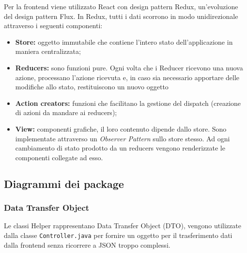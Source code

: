 Per la frontend viene utilizzato React con design pattern Redux, un'evoluzione del design pattern Flux.
In Redux, tutti i dati scorrono in modo unidirezionale attraverso i seguenti componenti:
\begin{itemize}
    \item \textbf{Store: }oggetto immutabile che contiene l'intero stato dell'applicazione in maniera centralizzata;
    \item \textbf{Reducers: }sono funzioni pure. Ogni volta che i Reducer ricevono una nuova azione, 
    processano l'azione ricevuta e, in caso sia necessario apportare delle modifiche allo stato, restituiscono un nuovo oggetto 
    \item \textbf{Action creators: }funzioni che facilitano la gestione del dispatch (creazione di azioni da mandare ai reducers); 
    \item \textbf{View: }componenti grafiche, il loro contenuto dipende dallo store. Sono implementate attraverso un \textit{Observer Pattern} sullo store stesso.
    Ad ogni cambiamento di stato prodotto da un reducers vengono renderizzate le componenti collegate ad esso.
\end{itemize} 


\subsection{Diagrammi dei package}
\subsubsection{Data Transfer Object}
Le classi Helper rappresentano Data Transfer Object (DTO), vengono utilizzate dalla classe \texttt{Controller.java} per fornire un oggetto per il trasferimento dati dalla frontend senza ricorrere a JSON troppo complessi.

